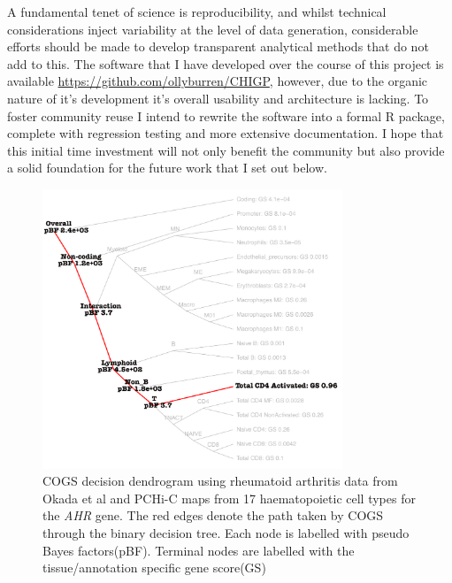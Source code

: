\documentclass[a4paper,11pt]{report}
\begin{document}
A fundamental tenet of science is reproducibility, and whilst technical considerations inject variability at the level of data generation, considerable efforts should be made to develop transparent analytical methods that do not add to this. The software that I have developed over the course of this project is available \url{https://github.com/ollyburren/CHIGP}, however, due to the organic nature of it's development it's overall usability and architecture is lacking. To foster community reuse I intend to rewrite the software into a formal R package, complete with regression testing and more extensive documentation. I hope that this initial time investment will not only benefit the community but also provide a solid foundation for the future work that I set out below. 


\begin{figure}[ht]
\centering
\includegraphics[width=0.8\textwidth]{AHR_dend.pdf}
\caption{COGS decision dendrogram using rheumatoid arthritis data from Okada et al and PCHi-C maps from 17 haematopoietic cell types for the \textit{AHR} gene. The red edges denote the path taken by COGS through the binary decision tree. Each node is labelled with pseudo Bayes factors(pBF). Terminal nodes are labelled with the tissue/annotation specific gene score(GS) }
\label{fig:AHR_dend}
\end{figure}
\end{document}
